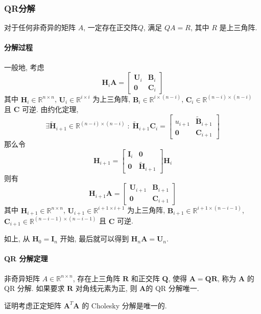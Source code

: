 \documentclass{ctexart}
\newcommand{\Rset}{\mathbb{R}}
\begin{document}
\subsubsection{QR分解}
    对于任何非奇异的矩阵 $A$, 一定存在正交阵$Q$,
    满足 $QA=R$, 其中 $R$ 是上三角阵.
\paragraph{分解过程}
    一般地, 考虑 \[
        \mathbf{H}_i \mathbf{A} = \begin{bmatrix}
            \mathbf{U}_i & \mathbf{B}_i \\
        \mathbf{0} & \mathbf{C}_i\end{bmatrix}\]
    其中 $\mathbf{H}_i \in \Rset^{n \times n}$, $\mathbf{U}_i \in \Rset^{i \times i}$ 为上三角阵,
        $ \mathbf{B}_i \in \Rset^{i \times (n-i)}$, $\mathbf{C}_i \in \Rset^{(n-i) \times (n-i)}$ 且 $\mathbf{C}$ 可逆.
    由约化定理, \[
        \exists \tilde{\mathbf{H}}_{i+1} \in \Rset^{(n-i)\times (n-i)}\;:\;
        \tilde{\mathbf{H}}_{i+1}\mathbf{C}_i = \begin{bmatrix} u_{i+1} & \tilde{\mathbf{B}}_{i+1} \\ \mathbf{0} & \mathbf{C}_{i+1} \end{bmatrix}\]
    那么令 \[
        \mathbf{H}_{i+1} = \begin{bmatrix}  \mathbf{I}_{i} & \mathbf{0} \\ \mathbf{0} & \tilde{\mathbf{H}}_{i+1}  \end{bmatrix} \mathbf{H}_i\]
    则有 \[
        \mathbf{H}_{i+1} \mathbf{A} = \begin{bmatrix}
            \mathbf{U}_{i+1} & \mathbf{B}_{i+1} \\
        \mathbf{0} & \mathbf{C}_{i+1}\end{bmatrix}\]
    其中 $\mathbf{H}_{i+1} \in \Rset^{n \times n}$, $\mathbf{U}_{i+1} \in \Rset^{i+1 \times i+1}$ 为上三角阵,
        $ \mathbf{B}_{i+1} \in \Rset^{i+1 \times (n-i-1)}$, $\mathbf{C}_{i+1} \in \Rset^{(n-i-1) \times (n-i-1)}$ 且 $\mathbf{C}$ 可逆.\par
    如上, 从 $ \mathbf{H}_0 = \mathbf{I}_n$ 开始, 最后就可以得到 $ \mathbf{H}_n \mathbf{A} = \mathbf{U}_n$.
\paragraph{QR 分解定理}
    非奇异矩阵 $A \in \Rset^{n \times n}$,
    存在上三角阵 $\mathbf{R}$ 和正交阵 $\mathbf{Q}$, 使得 $\mathbf{A} = \mathbf{Q} \mathbf{R} $,
    称为 $\mathbf{A} $ 的 QR 分解.
    如果要求 $\mathbf{R}$ 对角线元素为正, 则 $\mathbf{A} $的 QR 分解唯一.\par
    证明考虑正定矩阵 $\mathbf{A}^T \mathbf{A} $ 的 Cholesky 分解是唯一的.
\end{document}
